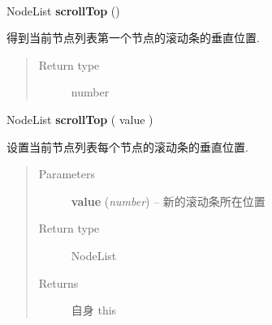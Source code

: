 \documentclass[letterpaper,10pt,english]{sphinxmanual}
\begin{document}
\begin{fulllineitems}
\label{api/core/node/scrollTop:Node.scrollTop}~
\begin{DUlineblock}{0em}
\item[] NodeList \textbf{scrollTop} ()
\item[] 得到当前节点列表第一个节点的滚动条的垂直位置.
\end{DUlineblock}
\begin{quote}\begin{description}
\item[{Return type}] \leavevmode
number

\end{description}\end{quote}

\begin{DUlineblock}{0em}
\item[] NodeList \textbf{scrollTop} ( value )
\item[] 设置当前节点列表每个节点的滚动条的垂直位置.
\end{DUlineblock}
\begin{quote}\begin{description}
\item[{Parameters}] \leavevmode
\textbf{value} (\emph{number}) -- 新的滚动条所在位置

\item[{Return type}] \leavevmode
NodeList

\item[{Returns}] \leavevmode
自身 this

\end{description}\end{quote}

\end{fulllineitems}
\end{document}
